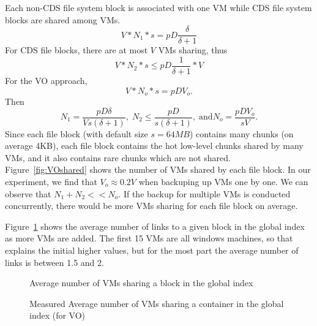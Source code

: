 Each non-CDS file system block is associated with one VM while CDS file system blocks are
shared among VMs. 
\[
V *N_1 *s  = pD  \frac{\delta} {\delta +1}
\]
For CDS file blocks, there are at most $V$ VMs sharing, thus
\[
V *N_2 *s  \leq pD  \frac{1} {\delta +1} *V
\]
For the VO approach, 
\[
V *N_o *s  = pD  V_o.
\]
Then
\[
N_1= \frac{pD \delta} {V s (\delta +1)},\; 
N_2 \leq \frac{pD } {s (\delta +1)}, \; 
\mbox{and} N_o = \frac{pD V_o } {s V}.
\]
Since each file block (with default size $s=64MB$) contains many chunks (on average 4KB),
each file block contains the hot low-level chunks shared by many VMs, and it also contains
rare chunks which are not shared.
Figure~\ref{fig:VOshared} shows the number of VMs shared by each file block.
In our experiment, we find that $V_o \approx 0.2 V$ when backuping up VMs one by one.
We can observe that $N_1 +N_2 << N_o$.
If  the backup for multiple VMs is conducted concurrently, there would be more
VMs sharing for each file block on average.

Figure~\ref{fig-vo-links} shows the average number of links to 
a given block in the global index as more VMs are added. 
The first 15 VMs are all windows machines, so that explains the initial 
higher values, but for the most part the average number of 
links is between 1.5 and 2.

\begin{figure}[ht]
  \centering
  \caption{Average number of VMs sharing a block in the global index}
  \label{fig-vo-links}
\end{figure}

\begin{figure}[ht]
  \centering
  \caption{Measured Average number of VMs sharing a container in the global index (for VO)}
  \label{fig-vo-container-links}
\end{figure}



